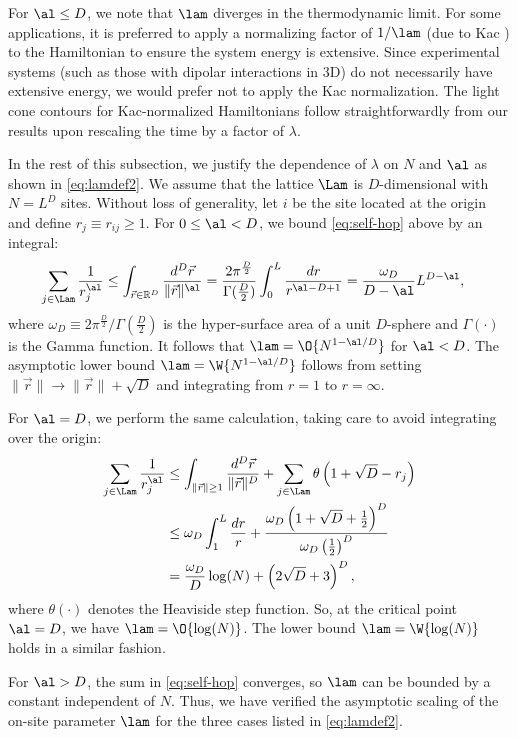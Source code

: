 For $\al \le D$, we note that $\lam$ diverges in the thermodynamic limit.
For some applications, it is preferred to apply a normalizing factor of $1/\lam$ (due to Kac \cite{Kac63}) to the Hamiltonian to ensure the system energy is extensive. Since experimental systems (such as those with dipolar interactions in 3D) do not necessarily have extensive energy, we would prefer not to apply the Kac normalization. The light cone contours for Kac-normalized Hamiltonians follow straightforwardly from our results upon rescaling the time by a factor of $\lambda$.

In the rest of this subsection, we justify the dependence of $\lambda$ on $N$ and $\al$ as shown in \cref{eq:lamdef2}.
We assume that the lattice $\Lam$ is $D$-dimensional with $N = L^D$ sites.
Without loss of generality, let $i$ be the site located at the origin and define $r_j \equiv r_{ij} \ge 1$.
For $0\le \al < D$, we bound \cref{eq:self-hop} above by an integral:
\begin{align}
	\sum_{j\in\Lam} \frac{1}{r_{j}^{\al}} &\le \int_{\vec{r}\in \mathbb{R}^D} \frac{d^D\vec{r}}{\|\vec{r}\|^\al}
	= \frac{2\pi^{\frac D 2}}{\Gamma(\frac D2)} \int_0^L \frac{dr}{r^{\al-D+1}}  = \frac{\omega_D}{D-\al}L^{D-\al},
\end{align}
where $\omega_D\equiv 2\pi^{\frac D 2}\big/\Gamma(\frac{D}{2})$ is the hyper-surface area of a unit $D$-sphere and $\Gamma(\cdot)$ is the Gamma function.  It follows that $\lam = \O{ N^{1-\al/D}}$  for $\al<D$.
The asymptotic lower bound $\lam = \W{N^{1-\al/D}}$ follows from setting $\|\vec r\| \rightarrow \|\vec r\| +\sqrt D$ and integrating from $r=1$ to $r=\infty$.

For $\al = D$, we perform the same calculation, taking care to avoid integrating over the origin:
\begin{align}
	\sum_{j\in\Lam} \frac{1}{r_{j}^{\al}} &\le  \int_{\|\vec{r}\| \ge 1} \frac{d^D\vec{r}}{\|\vec{r}\|^D} + \sum_{j \in \Lam} \theta \left( 1+\sqrt{D} - r_j\right)
    \\ & \le  \omega_D \int_1^L \frac{dr}{r} + \frac{\omega_D\left(1+\sqrt D+\frac12\right)^D}{\omega_D\left(\frac12\right)^D}
    \\ &= \frac {\omega_D}D \log(N) + \left(2\sqrt D+3\right)^D,
\end{align}
where $\theta(\cdot)$ denotes the Heaviside step function. So, at the critical point $\al=D$, we have $\lam = \O{ \log(N)}$.
The lower bound $\lam = \W{\log(N)}$ holds in a similar fashion.

For $\al > D$, the sum in \cref{eq:self-hop} converges, so $\lam$ can be bounded by a constant independent of $N$.
Thus, we have verified the asymptotic scaling of the on-site parameter $\lam$ for the three cases listed in  \cref{eq:lamdef2}.

